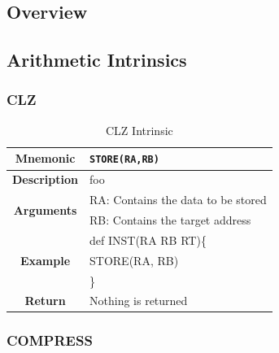 \documentclass{article}
\begin{document}
\subsection{Overview}
\label{sec:IntrinsicOverview}

\subsection{Arithmetic Intrinsics}
\label{sec:ArithIntrinsics}

\subsubsection{CLZ}
\label{sec:CLZ}

\begin{table}[h]
\begin{center}
\caption{CLZ Intrinsic}
\vspace{0.125in}
\label{tab:CLZIntrinsic}
\begin{tabular}{|c|l|}
\hline
\textbf{Mnemonic} & \texttt{STORE(RA,RB)}\\
\hline
\textbf{Description} & foo\\
\hline
\multirow{2}{*}{\textbf{Arguments}} & RA: Contains the data to be stored\\
                          			     & RB: Contains the target address \\
\hline
\multirow{3}{*}{\textbf{Example}} & def INST(RA RB RT)\{\\
                          			  &   STORE(RA, RB)\\
                                                    & \}\\
\hline
\textbf{Return} & Nothing is returned\\                                                    
\hline
\end{tabular}
\end{center}
\end{table}

\clearpage
\subsubsection{COMPRESS}
\label{sec:COMPRESS}
\end{document}
